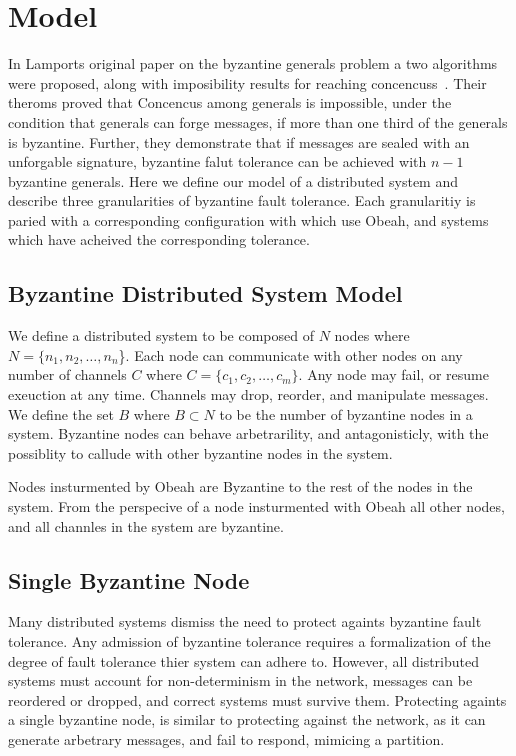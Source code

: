 \section{Model}
\label{sec:model}

In Lamports original paper on the byzantine generals problem a two algorithms
were proposed, along with imposibility results for reaching
concencuss~\cite{Lamport:1982:BGP:357172.357176}. Their theroms proved that
Concencus among generals is impossible, under the condition that generals can
forge messages, if more than one third of the generals is byzantine. Further,
they demonstrate that if messages are sealed with an unforgable signature,
byzantine falut tolerance can be achieved with $n-1$ byzantine generals. Here
we define our model of a distributed system and describe three granularities of
byzantine fault tolerance. Each granularitiy is paried with a corresponding
configuration with which use Obeah, and systems which have acheived the
corresponding tolerance.

\subsection{Byzantine Distributed System Model}

We define a distributed system to be composed of $N$ nodes where $N = \{n_1,
n_2, \dots, n_n$\}. Each node can communicate with other nodes on any number of
channels $C$ where $C = \{c_1, c_2, \dots, c_m\}$. Any node may fail, or resume
exeuction at any time. Channels may drop, reorder, and manipulate messages. We
define the set $B$ where $B \subset N$ to be the number of byzantine nodes in a
system. Byzantine nodes can behave arbetrarility, and antagonisticly, with the
possiblity to callude with other byzantine nodes in the system.

Nodes insturmented by Obeah are Byzantine to the rest of the nodes in the
system. From the perspecive of a node insturmented with Obeah all other nodes,
and all channles in the system are byzantine.


\subsection{Single Byzantine Node}

Many distributed systems dismiss the need to protect againts byzantine fault
tolerance. Any admission of byzantine tolerance requires a formalization of the
degree of fault tolerance thier system can adhere to. However, all distributed
systems must account for non-determinism in the network, messages can be
reordered or dropped, and correct systems must survive them. Protecting againts
a single byzantine node, is similar to protecting against the network, as it
can generate arbetrary messages, and fail to respond, mimicing a partition.

